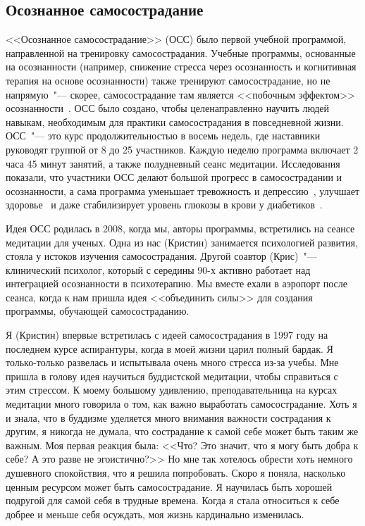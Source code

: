 	
	\subsection*{Осознанное самосострадание}
	
	<<Осознанное самосострадание>> (ОСС) было первой учебной программой, направленной на тренировку самосострадания. Учебные программы, основанные на осознанности (например, снижение стресса через осознанность и когнитивная терапия на основе осознанности) также тренируют самосострадание, но не напрямую~"--- скорее, самосострадание там является <<побочным эффектом>> осознанности~\cite{11,12,13}. ОСС было создано, чтобы целенаправленно научить людей навыкам, необходимым для практики самосострадания в повседневной жизни. ОСС~"--- это курс продолжительностью в восемь недель, где наставники руководят группой от 8 до 25 участников. Каждую неделю программа включает 2 часа 45 минут занятий, а также полудневный сеанс медитации. Исследования показали, что участники ОСС делают большой прогресс в самосострадании и осознанности, а сама программа уменьшает тревожность и депрессию~\cite{14}, улучшает здоровье~\cite{15} и даже стабилизирует уровень глюкозы в крови у диабетиков~\cite{16}.
	
	Идея ОСС родилась в 2008, когда мы, авторы программы, встретились на сеансе  медитации для ученых. Одна из нас (Кристин) занимается психологией развития, стояла у истоков изучения самосострадания. Другой соавтор (Крис)~"--- клинический психолог, который с середины 90-х активно работает над интеграцией осознанности в психотерапию. Мы вместе ехали в аэропорт после сеанса, когда к нам пришла идея <<объединить силы>> для создания программы, обучающей самосостраданию.
	
	Я (Кристин) впервые встретилась с идеей самосострадания в 1997 году на последнем курсе аспирантуры, когда в моей жизни царил полный бардак. Я только-только развелась и испытывала очень много стресса из-за учебы. Мне пришла в голову идея научиться буддистской медитации, чтобы справиться с этим стрессом. К моему большому удивлению, преподавательница на курсах медитации много говорила о том, как важно выработать самосострадание. Хоть я и знала, что в буддизме уделяется много внимания важности сострадания к другим, я никогда не думала, что сострадание к самой себе может быть таким же важным. Моя первая реакция была: <<Что? Это значит, что я могу быть добра к себе? А это разве не эгоистично?>> Но мне так хотелось обрести хоть немного душевного спокойствия, что я решила попробовать. Скоро я поняла, насколько ценным ресурсом может быть самосострадание. Я научилась быть хорошей подругой для самой себя в трудные времена. Когда я стала относиться к себе добрее и меньше себя осуждать, моя жизнь кардинально изменилась. 
	
